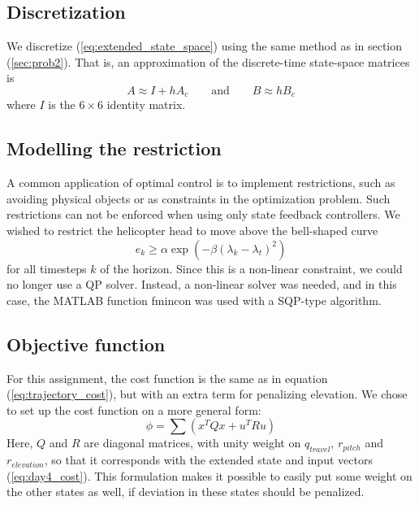 \subsection{Discretization}
We discretize (\ref{eq:extended_state_space}) using the same method as in section (\ref{sec:prob2}). That is, an approximation of the discrete-time state-space matrices is
\begin{equation}
    A \approx I + hA_c
    \qquad\text{and}\qquad
    B \approx hB_c
\end{equation}
where $I$ is the $6\times6$ identity matrix.

\subsection{Modelling the restriction}
A common application of optimal control is to implement restrictions, such as avoiding physical objects or as constraints in the optimization problem. Such restrictions can not be enforced when using only state feedback controllers. We wished to restrict the helicopter head to move above the bell-shaped curve
\begin{equation}
    e_k \geq \alpha \exp (-\beta (\lambda_k - \lambda_t)^2 )
\end{equation}
for all timesteps $k$ of the horizon. Since this is a non-linear constraint, we could no longer use a QP solver. Instead, a non-linear solver was needed, and in this case, the MATLAB function fmincon was used with a SQP-type algorithm.

\subsection{Objective function}
For this assignment, the cost function is the same as in equation (\ref{eq:trajectory_cost}), but with an extra term for penalizing elevation. We chose to set up the cost function on a more general form:
\begin{equation}
    \phi=\sum(x^{T}Qx+u^{T}Ru)
\end{equation}
Here, $Q$ and $R$ are diagonal matrices, with unity weight on $q_{travel}$, $r_{pitch}$ and $r_{elevation}$, so that it corresponds with the extended state and input vectors (\ref{eq:day4_cost}). This formulation makes it possible to easily put some weight on the other states as well, if deviation in these states should be penalized.

